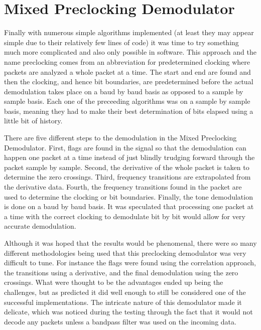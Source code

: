 \section{Mixed Preclocking Demodulator}
Finally with numerous simple algorithms implemented (at least they may appear simple due to their relatively few lines of code) it was time to try something much more complicated and also only possible in software. This approach and the name preclocking comes from an abbreviation for predetermined clocking where packets are analyzed a whole packet at a time. The start and end are found and then the clocking, and hence bit boundaries, are predetermined before the actual demodulation takes place on a baud by baud basis as opposed to a sample by sample basis. Each one of the preceeding algorithms was on a sample by sample basis, meaning they had to make their best determination of bits elapsed using a little bit of history.

There are five different steps to the demodulation in the Mixed Preclocking Demodulator. First, flags are found in the signal so that the demodulation can happen one packet at a time instead of just blindly trudging forward through the packet sample by sample. Second, the derivative of the whole packet is taken to  determine the zero crossings. Third, frequency transitions are extrapolated from the derivative data. Fourth, the frequency transitions found in the packet are used to determine the clocking or bit boundaries. Finally, the tone demodulation is done on a baud by baud basis. It was speculated that processing one packet at a time with the correct clocking to demodulate bit by bit would allow for very accurate demodulation.

Although it was hoped that the results would be phenomenal, there were so many different methodologies being used that this preclocking demodulator was very difficult to tune. For instance the flags were found using the correlation approach, the transitions using a derivative, and the final demodulation using the zero crossings. What were thought to be the advantages ended up being the challenges, but as predicted it did well enough to still be considered one of the successful implementations. The intricate nature of this demodulator made it delicate, which was noticed during the testing through the fact that it would not decode any packets unless a bandpass filter was used on the incoming data.

